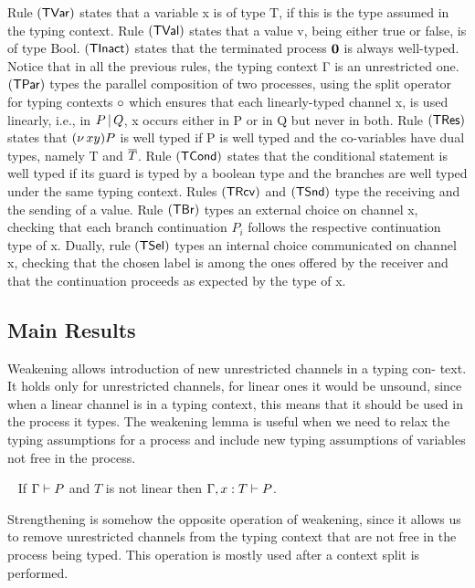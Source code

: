 Rule $\mathsf{{\displaystyle (TVar)}}$ states that a variable x is of type T, if this is the type assumed in the typing context. Rule $\mathsf{{\displaystyle (TVal)}}$ states that a value v, being either true or false, is of type Bool. $\mathsf{{\displaystyle (TInact)}}$ states that the terminated process $\mathbf{0}$ is always well-typed. Notice that in all the previous rules, the typing context Γ is an unrestricted one. $\mathsf{{\displaystyle (TPar)}}$ types the parallel composition of two processes, using the split operator for typing contexts $\circ$ which ensures that each linearly-typed channel x, is used linearly, i.e., in $P \,|\, Q$, x occurs either in P or in Q but never in both. Rule $\mathsf{{\displaystyle (TRes)}}$ states that $(\nu\,xy) P$ is well typed if P is well typed and the co-variables have dual types, namely T and $\overline{T}$. Rule $\mathsf{{\displaystyle (TCond)}}$ states that the conditional statement is well typed if its guard is typed by a boolean type and the branches are well typed under the same typing context. Rules $\mathsf{{\displaystyle (TRcv)}}$ and $\mathsf{{\displaystyle (TSnd)}}$ type the receiving and the sending of a value. Rule $\mathsf{{\displaystyle (TBr)}}$ types an external choice on channel x, checking that each branch continuation $P_i$ follows the respective continuation type of x. Dually, rule $\mathsf{{\displaystyle (TSel)}}$ types an internal choice communicated on channel x, checking that the chosen label is among the ones offered by the receiver and that the continuation proceeds as expected by the type of x.

\subsection{Main Results}

Weakening allows introduction of new unrestricted channels in a typing con- text. It holds only for unrestricted channels, for linear ones it would be unsound, since when a linear channel is in a typing context, this means that it should be used in the process it types. The weakening lemma is useful when we need to relax the typing assumptions for a process and include new typing assumptions of variables not free in the process.

\begin{lemma}~\label{lmm:weakening}
  If $\Gamma \mathrel{\vdash} P$ and $T$ is not linear then $\Gamma, x: T \mathrel{\vdash} P$.
\end{lemma}

Strengthening is somehow the opposite operation of weakening, since it allows us to remove unrestricted channels from the typing context that are not free in the process being typed. This operation is mostly used after a context split is performed.


